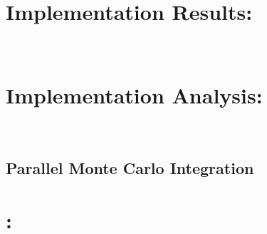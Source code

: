 \documentclass[11pt]{article}
\begin{document}
\begin{page}
\noindent \chapter{Implementation Results:}\\

\noindent \chapter{Implementation Analysis:}\\

\section{Parallel Monte Carlo Integration}
\noindent \chapter{:} 

\end{page}
\end{document}
